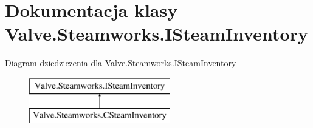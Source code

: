 \hypertarget{class_valve_1_1_steamworks_1_1_i_steam_inventory}{}\section{Dokumentacja klasy Valve.\+Steamworks.\+I\+Steam\+Inventory}
\label{class_valve_1_1_steamworks_1_1_i_steam_inventory}
Diagram dziedziczenia dla Valve.\+Steamworks.\+I\+Steam\+Inventory\begin{figure}[H]
\begin{center}
\leavevmode
\includegraphics[height=2.000000cm]{class_valve_1_1_steamworks_1_1_i_steam_inventory}
\end{center}
\end{figure}
